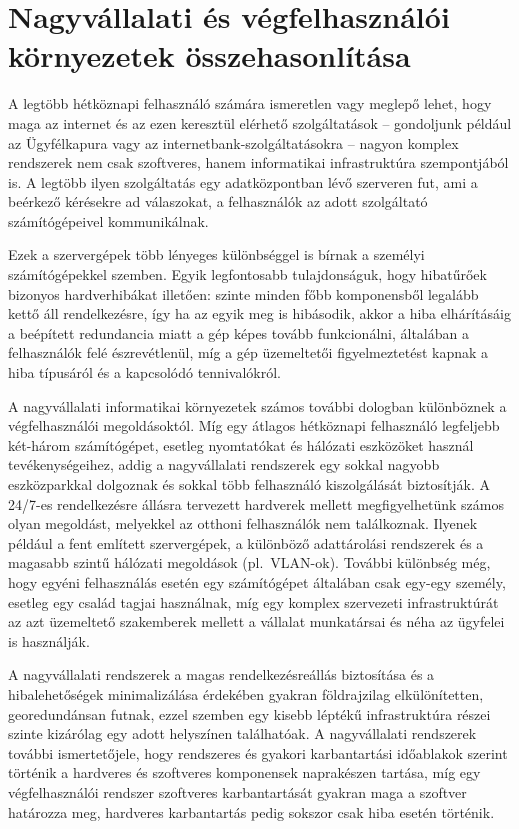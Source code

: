 \section{Nagyvállalati és végfelhasználói környezetek összehasonlítása}
A legtöbb hétköznapi felhasználó számára ismeretlen vagy meglepő lehet, hogy maga az internet és az ezen keresztül elérhető szolgáltatások -- gondoljunk például az Ügyfélkapura vagy az internetbank-szolgáltatásokra -- nagyon komplex rendszerek nem csak szoftveres, hanem informatikai infrastruktúra szempontjából is. A legtöbb ilyen szolgáltatás egy adatközpontban lévő szerveren fut, ami a beérkező kérésekre ad válaszokat, a felhasználók az adott szolgáltató számítógépeivel kommunikálnak.

Ezek a szervergépek több lényeges különbséggel is bírnak a személyi számítógépekkel szemben. Egyik legfontosabb tulajdonságuk, hogy hibatűrőek bizonyos hardverhibákat illetően: szinte minden főbb komponensből legalább kettő áll rendelkezésre, így ha az egyik meg is hibásodik, akkor a hiba elhárításáig a beépített redundancia miatt a gép képes tovább funkcionálni, általában a felhasználók felé észrevétlenül, míg a gép üzemeltetői figyelmeztetést kapnak a hiba típusáról és a kapcsolódó tennivalókról.

A nagyvállalati informatikai környezetek számos további dologban különböznek a végfelhasználói megoldásoktól. Míg egy átlagos hétköznapi felhasználó legfeljebb két-három számítógépet, esetleg nyomtatókat és hálózati eszközöket használ tevékenységeihez, addig a nagyvállalati rendszerek egy sokkal nagyobb eszközparkkal dolgoznak és sokkal több felhasználó kiszolgálását biztosítják. A 24/7-es rendelkezésre állásra tervezett hardverek mellett megfigyelhetünk számos olyan megoldást, melyekkel az otthoni felhasználók nem találkoznak. Ilyenek például a fent említett szervergépek, a különböző adattárolási rendszerek és a magasabb szintű hálózati megoldások (pl.~VLAN-ok). További különbség még, hogy egyéni felhasználás esetén egy számítógépet általában csak egy-egy személy, esetleg egy család tagjai használnak, míg egy komplex szervezeti infrastruktúrát az azt üzemeltető szakemberek mellett a vállalat munkatársai és néha az ügyfelei is használják.

A nagyvállalati rendszerek a magas rendelkezésreállás biztosítása és a hibalehetőségek minimalizálása érdekében gyakran földrajzilag elkülönítetten, georedundánsan futnak, ezzel szemben egy kisebb léptékű infrastruktúra részei szinte kizárólag egy adott helyszínen találhatóak. A nagyvállalati rendszerek további ismertetőjele, hogy rendszeres és gyakori karbantartási időablakok szerint történik a hardveres és szoftveres komponensek naprakészen tartása, míg egy végfelhasználói rendszer szoftveres karbantartását gyakran maga a szoftver határozza meg, hardveres karbantartás pedig sokszor csak hiba esetén történik.

